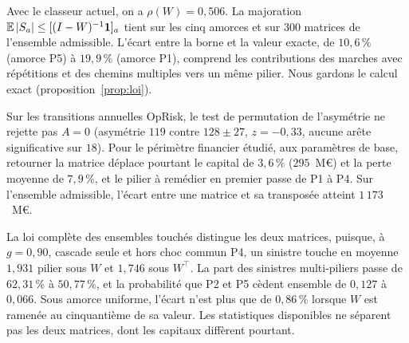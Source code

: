 Avec le classeur actuel, on a $\rho(W)=0{,}506$. La majoration $\mathbb{E}\,|S_a|\le[(I-W)^{-1}\mathbf 1]_a$
tient sur les cinq amorces et sur $300$ matrices de l'ensemble admissible. L'écart entre la borne
et la valeur exacte, de $10{,}6\,\%$ (amorce P5) à $19{,}9\,\%$ (amorce P1), comprend les
contributions des marches avec répétitions et des chemins multiples vers un même pilier. Nous gardons le calcul exact (proposition~\ref{prop:loi}).

Sur les transitions annuelles OpRisk, le test de permutation de l'asymétrie ne rejette pas $A=0$
(asymétrie $119$ contre $128 \pm 27$, $z=-0{,}33$, aucune arête significative sur $18$). Pour le
périmètre financier étudié, aux paramètres de base, retourner la matrice déplace pourtant le capital de $3{,}6\,\%$
($295$~M\euro) et la perte moyenne de $7{,}9\,\%$, et le pilier à remédier en premier passe de P1 à
P4. Sur l'ensemble admissible, l'écart entre une matrice et sa transposée atteint $1\,173$~M\euro{}.

La loi complète des ensembles touchés distingue les deux matrices, puisque, à $g=0{,}90$, cascade seule et hors choc commun P4, un sinistre touche en
moyenne $1{,}931$ pilier sous $W$ et $1{,}746$ sous $W^\top$. La part des sinistres multi-piliers
passe de $62{,}31\,\%$ à $50{,}77\,\%$, et la probabilité que P2 et P5 cèdent ensemble de $0{,}127$
à $0{,}066$. Sous amorce uniforme, l'écart n'est plus que de $0{,}86\,\%$ lorsque $W$ est ramenée
au cinquantième de sa valeur. Les statistiques disponibles ne séparent pas les deux matrices, dont les capitaux diffèrent pourtant.

